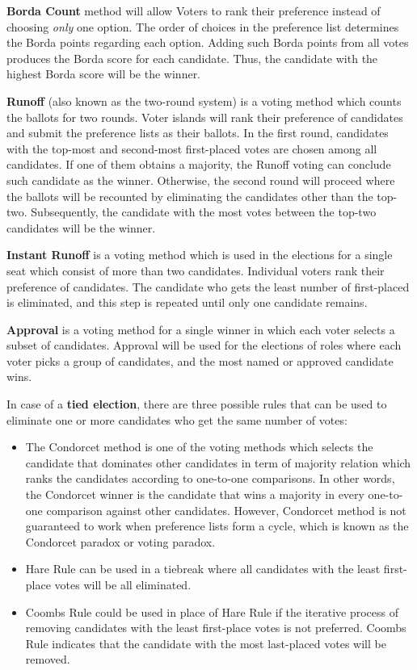 \textbf{Borda Count} method will allow Voters to rank their preference instead of choosing \emph{only} one option. The order of choices in the preference list determines the Borda points regarding each option. Adding such Borda points from all votes produces the Borda score for each candidate. Thus, the candidate with the highest Borda score will be the winner.

\textbf{Runoff} (also known as the two-round system) is a voting method which counts the ballots for two rounds. Voter islands will rank their preference of candidates and submit the preference lists as their ballots. In the first round, candidates with the top-most and second-most first-placed votes are chosen among all candidates. If one of them obtains a majority, the Runoff voting can conclude such candidate as the winner. Otherwise, the second round will proceed where the ballots will be recounted by eliminating the candidates other than the top-two. Subsequently, the candidate with the most votes between the top-two candidates will be the winner.

\textbf{Instant Runoff} is a voting method which is used in the elections for a single seat which consist of more than two candidates. 
Individual voters rank their preference of candidates. The candidate who gets the least number of first-placed is eliminated, and this step is repeated until only one candidate remains.

\textbf{Approval} is a voting method for a single winner in which each voter selects a subset of candidates. Approval will be used for the elections of roles where each voter picks a group of candidates, and the most named or approved candidate wins.

In case of a \textbf{tied election}, there are three possible rules that can be used to eliminate one or more candidates who get the same number of votes:
\begin{itemize}
    \item The Condorcet method is one of the voting methods which selects the candidate that dominates other candidates in term of majority relation which ranks the candidates according to one-to-one comparisons. In other words, the Condorcet winner is the candidate that wins a majority in every one-to-one comparison against other candidates. However, Condorcet method is not guaranteed to work when preference lists form a cycle, which is known as the Condorcet paradox or voting paradox.
    \item Hare Rule can be used in a tiebreak where all candidates with the least first-place votes will be all eliminated.
    \item Coombs Rule could be used in place of Hare Rule if the iterative process of removing candidates with the least first-place votes is not preferred. Coombs Rule indicates that the candidate with the most last-placed votes will be removed.
\end{itemize}

